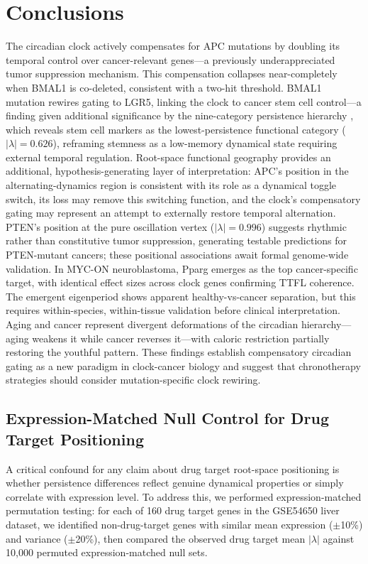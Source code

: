 \documentclass[11pt,letterpaper]{article}
\begin{document}
\section{Conclusions}

The circadian clock actively compensates for APC mutations by doubling its temporal control over cancer-relevant genes---a previously underappreciated tumor suppression mechanism. This compensation collapses near-completely when BMAL1 is co-deleted, consistent with a two-hit threshold. BMAL1 mutation rewires gating to LGR5, linking the clock to cancer stem cell control---a finding given additional significance by the nine-category persistence hierarchy \citep{whiteside2026paper1}, which reveals stem cell markers as the lowest-persistence functional category ($|\lambda| = 0.626$), reframing stemness as a low-memory dynamical state requiring external temporal regulation. Root-space functional geography provides an additional, hypothesis-generating layer of interpretation: APC's position in the alternating-dynamics region is consistent with its role as a dynamical toggle switch, its loss may remove this switching function, and the clock's compensatory gating may represent an attempt to externally restore temporal alternation. PTEN's position at the pure oscillation vertex ($|\lambda| = 0.996$) suggests rhythmic rather than constitutive tumor suppression, generating testable predictions for PTEN-mutant cancers; these positional associations await formal genome-wide validation. In MYC-ON neuroblastoma, Pparg emerges as the top cancer-specific target, with identical effect sizes across clock genes confirming TTFL coherence. The emergent eigenperiod shows apparent healthy-vs-cancer separation, but this requires within-species, within-tissue validation before clinical interpretation. Aging and cancer represent divergent deformations of the circadian hierarchy---aging weakens it while cancer reverses it---with caloric restriction partially restoring the youthful pattern. These findings establish compensatory circadian gating as a new paradigm in clock-cancer biology and suggest that chronotherapy strategies should consider mutation-specific clock rewiring.

\subsection*{Expression-Matched Null Control for Drug Target Positioning}

A critical confound for any claim about drug target root-space positioning is whether persistence differences reflect genuine dynamical properties or simply correlate with expression level. To address this, we performed expression-matched permutation testing: for each of 160 drug target genes in the GSE54650 liver dataset, we identified non-drug-target genes with similar mean expression ($\pm$10\%) and variance ($\pm$20\%), then compared the observed drug target mean $|\lambda|$ against 10,000 permuted expression-matched null sets.
\end{document}
